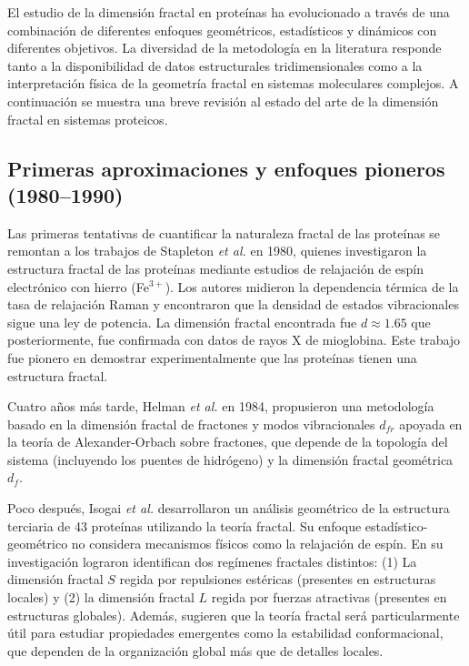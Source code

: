 El estudio de la dimensi\'{o}n fractal en prote\'{i}nas ha evolucionado a trav\'{e}s de una combinaci\'{o}n de diferentes enfoques geom\'{e}tricos, estad\'{i}sticos y din\'{a}micos con diferentes objetivos. La diversidad de la metodolog\'{i}a en la literatura responde tanto a la disponibilidad de datos estructurales tridimensionales como a la interpretaci\'{o}n f\'{i}sica de la geometr\'{i}a fractal en sistemas moleculares complejos. A continuaci\'{o}n se muestra una breve revisi\'{o}n al estado del arte de la dimensi\'{o}n fractal en sistemas proteicos.

\subsection{Primeras aproximaciones y enfoques pioneros (1980--1990)}

Las primeras tentativas de cuantificar la naturaleza fractal de las prote\'{i}nas se remontan a los trabajos de Stapleton \textit{et al.}\cite{Stapleton1980} en 1980, quienes investigaron la estructura fractal de las prote\'{i}nas mediante estudios de relajaci\'{o}n de esp\'{i}n electr\'{o}nico con hierro (Fe$^{3+}$). Los autores midieron la dependencia t\'{e}rmica de la tasa de relajaci\'{o}n Raman y encontraron que la densidad de estados vibracionales sigue una ley de potencia. La dimensi\'{o}n fractal encontrada fue $d \approx 1.65$ que posteriormente, fue confirmada con datos de rayos X de mioglobina. Este trabajo fue pionero en demostrar experimentalmente que las prote\'{i}nas tienen una estructura fractal. 

Cuatro años m\'{a}s tarde, Helman \textit{et al.}\cite{Helman1984} en 1984, propusieron una metodolog\'{i}a basado en la dimensi\'{o}n fractal de fractones y modos vibracionales $d_{fr}$ apoyada en la teor\'{i}a de Alexander-Orbach \cite{Alexander1982} sobre fractones, que depende de la topolog\'{i}a del sistema (incluyendo los puentes de hidr\'{o}geno) y la dimensi\'{o}n fractal geom\'{e}trica $d_f$.

Poco despu\'{e}s, Isogai \textit{et al.} \cite{Isogai1984} desarrollaron un an\'{a}lisis geom\'{e}trico de la estructura terciaria de 43 prote\'{i}nas utilizando la teor\'{i}a fractal. Su enfoque  estad\'{i}stico-geom\'{e}trico no considera mecanismos f\'{i}sicos como la relajaci\'{o}n de esp\'{i}n.
En su investigaci\'{o}n lograron identifican dos reg\'{i}menes fractales distintos: (1) La dimensi\'{o}n fractal $S$ regida por repulsiones est\'{e}ricas (presentes en estructuras locales) y (2) la dimensi\'{o}n fractal $L$ regida por fuerzas atractivas (presentes en estructuras globales). Adem\'{a}s, sugieren que la teor\'{i}a fractal ser\'{a} particularmente \'{u}til para estudiar propiedades emergentes como la estabilidad conformacional, que dependen de la organizaci\'{o}n global m\'{a}s que de detalles locales.

